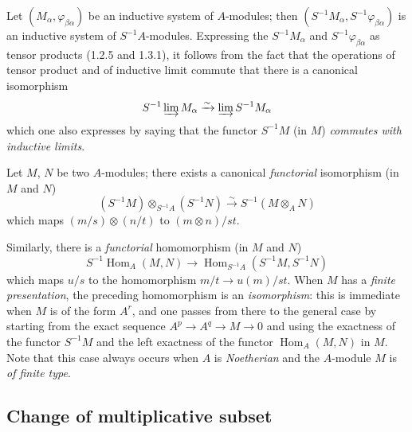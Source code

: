 \begin{env}[1.3.3]
\label{0.1.3.3}
Let $(M_\alpha,\varphi_{\beta\alpha})$ be an inductive system of $A$-modules; then $(S^{-1}M_\alpha,S^{-1}\varphi_{\beta\alpha})$ is an inductive system of $S^{-1}A$-modules.
Expressing the $S^{-1}M_\alpha$ and $S^{-1}\varphi_{\beta\alpha}$ as tensor products (1.2.5 and 1.3.1), it follows from the fact that the operations of tensor product and of inductive limit commute that there is a canonical isomorphism
\[
  S^{-1}\varinjlim M_\alpha\xrightarrow{\sim}\varinjlim S^{-1}M_\alpha
\]
which one also expresses by saying that the functor $S^{-1}M$ (in $M$) \emph{commutes with inductive limits}.
\end{env}

\begin{env}[1.3.4]
\label{0.1.3.4}
Let $M$, $N$ be two $A$-modules; there exists a canonical \emph{functorial} isomorphism (in $M$ and $N$)
\[
  (S^{-1}M)\otimes_{S^{-1}A}(S^{-1}N)
  \xrightarrow{\sim}
  S^{-1}(M\otimes_A N)
\]
which maps $(m/s)\otimes(n/t)$ to $(m\otimes n)/st$.
\end{env}

\begin{env}[1.3.5]
\label{0.1.3.5}
Similarly, there is a \emph{functorial} homomorphism (in $M$ and $N$)
\[
  S^{-1}\operatorname{Hom}_A(M,N)
  \longrightarrow
  \operatorname{Hom}_{S^{-1}A}(S^{-1}M,S^{-1}N)
\]
which maps $u/s$ to the homomorphism $m/t\to u(m)/st$.
When $M$ has a \emph{finite presentation}, the preceding homomorphism is an \emph{isomorphism}: this is immediate when $M$ is of the form $A^r$, and one passes from there to the general case by starting from the exact sequence $A^p\to A^q\to M\to 0$ and using the exactness of the functor $S^{-1}M$ and the left exactness of the functor $\operatorname{Hom}_A(M,N)$ in $M$.
Note that this case always occurs when $A$ is \emph{Noetherian} and the $A$-module $M$ is \emph{of finite type}.
\end{env}

\subsection{Change of multiplicative subset}
\label{subsection:0.1.4}

